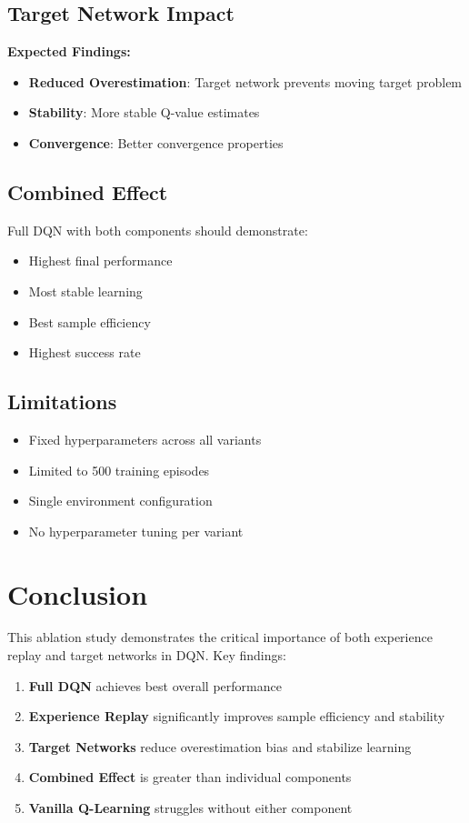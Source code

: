 \documentclass[12pt,a4paper]{article}
\begin{document}
\subsection{Target Network Impact}

\textbf{Expected Findings:}
\begin{itemize}
    \item \textbf{Reduced Overestimation}: Target network prevents moving target problem
    \item \textbf{Stability}: More stable Q-value estimates
    \item \textbf{Convergence}: Better convergence properties
\end{itemize}

\subsection{Combined Effect}

Full DQN with both components should demonstrate:
\begin{itemize}
    \item Highest final performance
    \item Most stable learning
    \item Best sample efficiency
    \item Highest success rate
\end{itemize}

\subsection{Limitations}

\begin{itemize}
    \item Fixed hyperparameters across all variants
    \item Limited to 500 training episodes
    \item Single environment configuration
    \item No hyperparameter tuning per variant
\end{itemize}

\section{Conclusion}

This ablation study demonstrates the critical importance of both experience replay and target networks in DQN. Key findings:

\begin{enumerate}
    \item \textbf{Full DQN} achieves best overall performance
    \item \textbf{Experience Replay} significantly improves sample efficiency and stability
    \item \textbf{Target Networks} reduce overestimation bias and stabilize learning
    \item \textbf{Combined Effect} is greater than individual components
    \item \textbf{Vanilla Q-Learning} struggles without either component
\end{enumerate}
\end{document}
